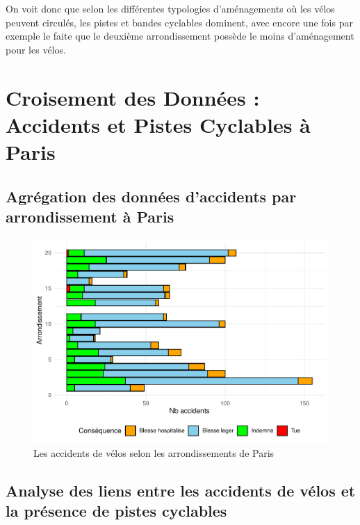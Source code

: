 \documentclass[french,]{compterendu}
\theoremstyle{urcastyle}
\theoremstyle{remark}
\begin{document}
On voit donc que selon les différentes typologies d'aménagements où les vélos peuvent circulés, les pistes et bandes cyclables dominent, avec encore une fois par exemple le faite que le deuxième arrondissement possède le moins d'aménagement pour les vélos.

\hypertarget{croisement-des-donnuxe9es-accidents-et-pistes-cyclables-uxe0-paris}{%
\section{Croisement des Données : Accidents et Pistes Cyclables à Paris}\label{croisement-des-donnuxe9es-accidents-et-pistes-cyclables-uxe0-paris}}

\hypertarget{agruxe9gation-des-donnuxe9es-daccidents-par-arrondissement-uxe0-paris}{%
\subsection{Agrégation des données d'accidents par arrondissement à Paris}\label{agruxe9gation-des-donnuxe9es-daccidents-par-arrondissement-uxe0-paris}}

\begin{figure}[H]

{\centering \includegraphics[width=1\linewidth]{Rapport_ADD_LEO-GABET_files/figure-latex/arrPARISaccident-1} 

}

\caption{Les accidents de vélos selon les arrondissements de Paris}\label{fig:arrPARISaccident}
\end{figure}

\hypertarget{analyse-des-liens-entre-les-accidents-de-vuxe9los-et-la-pruxe9sence-de-pistes-cyclables}{%
\subsection{Analyse des liens entre les accidents de vélos et la présence de pistes cyclables}\label{analyse-des-liens-entre-les-accidents-de-vuxe9los-et-la-pruxe9sence-de-pistes-cyclables}}
\end{document}
